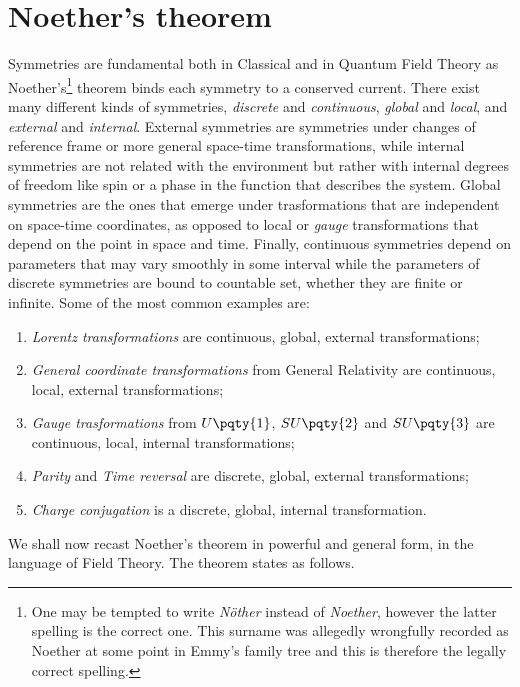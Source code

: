     \section{Noether's theorem}
        Symmetries are fundamental both in Classical and in Quantum Field Theory as Noether's\footnote{One may be tempted to write \emph{N\"other} instead of \emph{Noether}, however the latter spelling is the correct one. This surname was allegedly wrongfully recorded as Noether at some point in Emmy's family tree and this is therefore the legally correct spelling.} theorem binds each symmetry to a conserved current. There exist many different kinds of symmetries, \emph{discrete} and \emph{continuous}, \emph{global} and \emph{local}, and \emph{external} and \emph{internal}.
        External symmetries are symmetries under changes of reference frame or more general space-time transformations, while internal symmetries are not related with the environment but rather with internal degrees of freedom like spin or a phase in the function that describes the system.
        Global symmetries are the ones that emerge under trasformations that are independent on space-time coordinates, as opposed to local or \emph{gauge} transformations that depend on the point in space and time.
        Finally, continuous symmetries depend on parameters that may vary smoothly in some interval while the parameters of discrete symmetries are bound to countable set, whether they are finite or infinite.
        Some  of the most common examples are:
        \begin{enumerate}[label=\mybullet]
            \item \emph{Lorentz transformations} are continuous, global, external transformations;
            \item \emph{General coordinate transformations} from General Relativity are continuous, local, external transformations;
            \item \emph{Gauge trasformations} from $U\pqty{1}$, $SU\pqty{2}$ and $SU\pqty{3}$ are continuous, local, internal transformations;
            \item \emph{Parity} and \emph{Time reversal} are discrete, global, external transformations;
            \item \emph{Charge conjugation} is a discrete, global, internal transformation.
        \end{enumerate}

        We shall now recast Noether's theorem in powerful and general form, in the language of Field Theory.
        The theorem states as follows.

